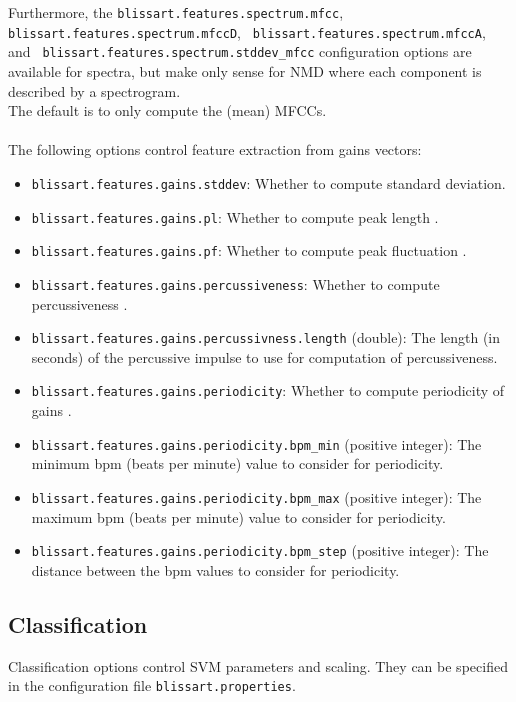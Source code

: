 Furthermore, the {\tt blissart.features.spectrum.mfcc}, {\tt
blissart.features.spectrum.mfccD}, {\tt
blissart.features.spectrum.mfccA}, and {\tt
blissart.features.spectrum.stddev\_mfcc} configuration options are available
for spectra, but make only sense for NMD where each component is
described by a spectrogram. 
\\
The default is to only compute the (mean) MFCCs.\\
\\
The following options control feature extraction from gains vectors:
\begin{itemize}
  \item {\tt blissart.features.gains.stddev}: Whether to compute standard
    deviation.
  \item {\tt blissart.features.gains.pl}: Whether to compute peak length
    \cite{Virtanen2005}.
  \item {\tt blissart.features.gains.pf}: Whether to compute peak fluctuation
    \cite{Virtanen2005}.
  \item {\tt blissart.features.gains.percussiveness}: Whether to compute
    percussiveness \cite{Uhle2003}.
  \item {\tt blissart.features.gains.percussivness.length} (double): The length
    (in seconds) of the percussive impulse to use for computation of
    percussiveness.
  \item {\tt blissart.features.gains.periodicity}: Whether to compute
    periodicity of gains \cite{Virtanen2005}.
  \item {\tt blissart.features.gains.periodicity.bpm\_min} (positive integer):
    The minimum bpm (beats per minute) value to consider for periodicity.
  \item {\tt blissart.features.gains.periodicity.bpm\_max} (positive integer):
    The maximum bpm (beats per minute) value to consider for periodicity.
  \item {\tt blissart.features.gains.periodicity.bpm\_step} (positive integer):
    The distance between the bpm values to consider for periodicity.
\end{itemize}


\subsection{Classification}
\label{section:ConfigFileClassification}

Classification options control SVM parameters and scaling. They can be specified
in the configuration file {\tt blissart.properties}.

